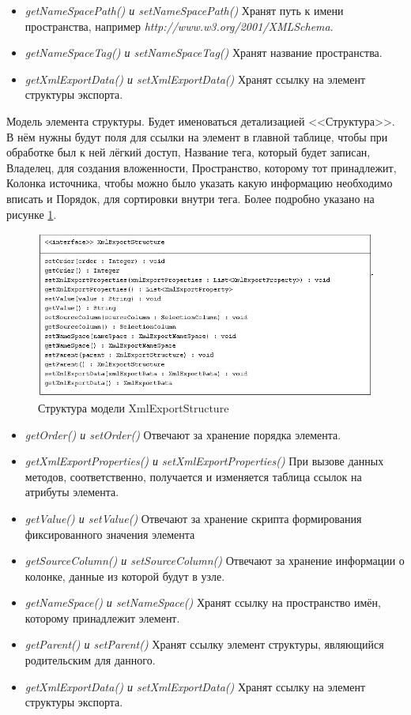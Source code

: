 \documentclass[a4paper,12pt]{diplom}
\begin{document}
\begin{itemize}
    \item \textit{getNameSpacePath() и setNameSpacePath()} Хранят путь к имени пространства, например \textit{http://www.w3.org/2001/XMLSchema}.
    \item \textit{getNameSpaceTag() и setNameSpaceTag()} Хранят название пространства.
    \item \textit{getXmlExportData() и setXmlExportData()} Хранят ссылку на элемент структуры экспорта.
\end{itemize}

Модель элемента структуры. Будет именоваться детализацией <<Структура>>. В нём нужны будут поля для ссылки на элемент в главной таблице, чтобы при обработке был к ней лёгкий доступ, Название тега, который будет записан, Владелец, для создания вложенности, Пространство, которому тот принадлежит, Колонка источника, чтобы можно было указать какую информацию необходимо вписать и Порядок, для сортировки внутри тега. Более подробно указано на рисунке \ref{fig:struct}. 

\begin{figure}[h!]
	\centering
	\includegraphics[width=\textwidth]{imgs/XmlExportStructure.jpg}
	\caption{Структура модели XmlExportStructure}
	\label{fig:struct}
\end{figure}

\begin{itemize}
    \item \textit{getOrder() и setOrder()} Отвечают за хранение порядка элемента.
    \item \textit{getXmlExportProperties() и setXmlExportProperties()} При вызове данных методов, соответственно, получается и изменяется таблица ссылок на атрибуты элемента.\item \textit{getValue() и setValue()} Отвечают за хранение скрипта формирования фиксированного значения элемента
    \item \textit{getSourceColumn() и setSourceColumn()} Отвечают за хранение информации о колонке, данные из которой будут в узле.
    \item \textit{getNameSpace() и setNameSpace()} Хранят ссылку на пространство имён, которому принадлежит элемент.
    \item \textit{getParent() и setParent()} Хранят ссылку элемент структуры, являющийся родительским для данного.
    \item \textit{getXmlExportData() и setXmlExportData()} Хранят ссылку на элемент структуры экспорта.
\end{itemize}
\end{document}
